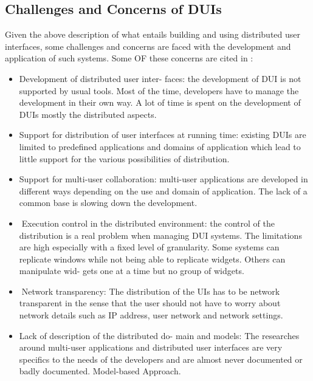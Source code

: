 \subsection{Challenges and Concerns of DUIs}
Given the above description of what entails building and using
distributed user interfaces, some challenges and concerns are faced
with the development and application of such systems. Some  OF these concerns
are cited in \cite{melchior2011distributed}:\\ 
\begin{itemize}
 \item Development of distributed user inter- faces: the development of DUI is
 not supported by usual tools. Most of the time, developers have to manage the development in their own way. A lot of time is spent on the development of DUIs mostly the distributed aspects.
􏰀 \item Support for distribution of user interfaces at running time:
existing DUIs are limited to predefined applications and domains of application which lead to little support for the various possibilities of distribution.
\item Support for multi-user collaboration: multi-user applications are developed in different ways depending on the use and domain of application. The lack
of a common base is slowing down the development.
\item 􏰀Execution control in the distributed environment: the control of the distribution is a real problem when managing DUI systems. The limitations are high especially with a fixed level of granularity. Some systems can replicate windows while not being able to replicate widgets. Others can manipulate wid- gets one at a time but no group of widgets.
\item 􏰀Network transparency: The distribution of the UIs has to be network transparent in the sense that the user should not have to worry about network details such as IP address, user network and network settings.
\item Lack of description of the distributed do- main and models: The researches around multi-user applications and distributed user interfaces are very specifics to the needs of the developers and are almost never documented or badly documented.
Model-based Approach. 
\end{itemize}

